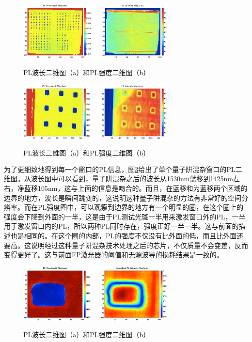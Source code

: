\documentclass{ZJUthesis}
\begin{document}
\begin{figure}[!ht]
  \centering
  \includegraphics[width=0.7\textwidth]{./Pictures/double_pl.eps}\\
  \caption{PL波长二维图（a）和PL强度二维图（b）}
  \label{fig_double_pl}
\end{figure}

\begin{figure}[!ht]
  \centering
  \includegraphics[width=0.7\textwidth]{./Pictures/double_pl2.eps}\\
  \caption{PL波长二维图（a）和PL强度二维图（b）}
  \label{fig_double_pl2}
\end{figure}

为了更细致地得到每一个窗口的PL信息，图\ref{fig_double_pl3}给出了单个量子阱混杂窗口的PL二维图。从波长图中可以看到，量子阱混杂之后的波长从1530nm蓝移到1425nm左右，净蓝移105nm，这与上面的信息是吻合的。而且，在蓝移和为蓝移两个区域的边界的地方，波长是瞬间跳变的，这说明这种量子阱混杂的方法有非常好的空间分辨率。而在PL强度图中，可以观察到边界的地方有一个明显的圈，在这个圈上的强度会下降到外面的一半，这是由于PL测试光斑一半用来激发窗口外的PL，一半用于激发窗口内的PL，所以两种PL同时存在，强度正好一半一半。这与前面的描述也是相同的。在这个圈的内部，PL的强度不仅没有比外面的低，而且比外面还要高。这说明经过这种量子阱混杂技术处理之后的芯片，不仅质量不会变差，反而变得更好了。这与前面FP激光器的阈值和无源波导的损耗结果是一致的。

\begin{figure}[!ht]
  \centering
  \includegraphics[width=0.7\textwidth]{./Pictures/double_pl3.eps}\\
  \caption{PL波长二维图（a）和PL强度二维图（b）}
  \label{fig_double_pl3}
\end{figure}
\end{document}
